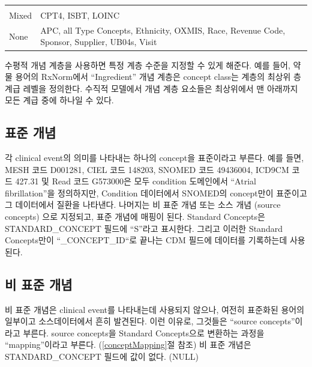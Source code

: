 \documentclass[11pt]{book}
\theoremstyle{definition}
\theoremstyle{definition}
\theoremstyle{definition}
\theoremstyle{remark}
\begin{document}
\begin{longtable}[]{@{}ll@{}}
\begin{minipage}[t]{0.47\columnwidth}
\end{minipage}\tabularnewline
\begin{minipage}[t]{0.13\columnwidth}\raggedright\strut
Mixed\strut
\end{minipage} & \begin{minipage}[t]{0.47\columnwidth}\raggedright\strut
CPT4, ISBT, LOINC\strut
\end{minipage}\tabularnewline
\begin{minipage}[t]{0.13\columnwidth}\raggedright\strut
None\strut
\end{minipage} & \begin{minipage}[t]{0.47\columnwidth}\raggedright\strut
APC, all Type Concepts, Ethnicity, OXMIS, Race, Revenue Code, Sponsor,
Supplier, UB04s, Visit\strut
\end{minipage}\tabularnewline
\bottomrule
\end{longtable}

수평적 개념 계층을 사용하면 특정 계층 수준을 지정할 수 있게 해준다. 예를
들어, 약물 용어의 RxNorm에서 ``Ingredient'' 개념 계층은 concept class는
계층의 최상위 층 계급 레벨을 정의한다. 수직적 모델에서 개념 계층
요소들은 최상위에서 맨 아래까지 모든 계급 중에 하나일 수 있다.

\subsection{표준 개념}\label{standardConcepts}

각 clinical event의 의미를 나타내는 하나의 concept을 표준이라고 부른다.
예를 들면, MESH 코드 D001281, CIEL 코드 148203, SNOMED 코드 49436004,
ICD9CM 코드 427.31 및 Read 코드 G573000은 모두 condition 도메인에서
``Atrial fibrillation''을 정의하지만, Condition 데이터에서 SNOMED의
concept만이 표준이고 그 데이터에서 질환을 나타낸다. 나머지는 비 표준
개념 또는 소스 개념 (source concepts) 으로 지정되고, 표준 개념에 매핑이
된다. Standard Concepts은 STANDARD\_CONCEPT 필드에 ``S''라고 표시한다.
그리고 이러한 Standard Concepts만이 ``\_CONCEPT\_ID``로 끝나는 CDM
필드에 데이터를 기록하는데 사용된다. 

\subsection{비 표준 개념}\label{--}

비 표준 개념은 clinical event를 나타내는데 사용되지 않으나, 여전히
표준화된 용어의 일부이고 소스데이터에서 흔히 발견된다. 이런 이유로,
그것들은 ``source concepts''이라고 부른다. source concepts을 Standard
Concepts으로 변환하는 과정을 ``mapping''이라고 부른다.
(\ref{conceptMapping}절 참조) 비 표준 개념은 STANDARD\_CONCEPT 필드에
값이 없다. (NULL)
\end{document}
